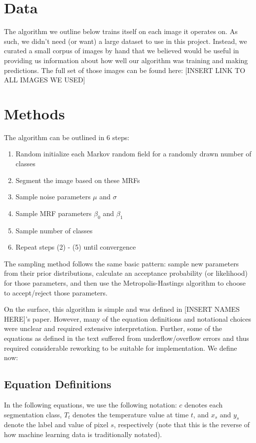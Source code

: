 \documentclass[11pt]{article}
\begin{document}
\section{Data}
The algorithm we outline below trains itself on each image it operates on. As such, we didn't need (or want) a large dataset to use in this project.
Instead, we curated a small corpus of images by hand that we believed would be useful in providing us information about how well our algorithm was training and making predictions. 
The full set of those images can be found here: [INSERT LINK TO ALL IMAGES WE USED]
\section{Methods}
The algorithm can be outlined in 6 steps:

\begin{enumerate}
	\item Random initialize each Markov random field for a randomly drawn number of classes
	\item Segment the image based on these MRFs
	\item Sample noise parameters $\mu$ and $\sigma$
	\item Sample MRF parameters $\beta_0$ and $\beta_1$
	\item Sample number of classes
	\item Repeat steps (2) - (5) until convergence
\end{enumerate}
The sampling method follows the same basic pattern: sample new parameters from their prior distributions, calculate an acceptance probability (or likelihood) for those parameters, and then use the Metropolis-Hastings algorithm to choose to accept/reject those parameters.

On the surface, this algorithm is simple and was defined in [INSERT NAMES HERE]'s paper. However, many of the equation definitions and notational choices were unclear and required extensive interpretation. 
Further, some of the equations as defined in the text suffered from underflow/overflow errors and thus required considerable reworking to be suitable for implementation. We define now:

\subsection{Equation Definitions}
In the following equations, we use the following notation:
$c$ denotes each segmentation class, $T_t$ denotes the temperature value at time $t$, and $x_s$ and $y_s$ denote the label and value of pixel $s$, respectively (note that this is the reverse of how machine learning data is traditionally notated). 
\end{document}
